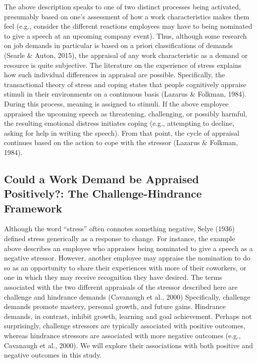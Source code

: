 \documentclass[
  man]{apa6}
\begin{document}
The above description speaks to one of two distinct processes being activated, presumably based on one's assessment of how a work characteristics makes them feel (e.g., consider the different reactions employees may have to being nominated to give a speech at an upcoming company event). Thus, although some research on job demands in particular is based on a priori classifications of demands (Searle \& Auton, 2015), the appraisal of any work characteristic as a demand or resource is quite subjective. The literature on the experience of stress explains how such individual differences in appraisal are possible. Specifically, the transactional theory of stress and coping states that people cognitively appraise stimuli in their environments on a continuous basis (Lazarus \& Folkman, 1984). During this process, meaning is assigned to stimuli. If the above employee appraised the upcoming speech as threatening, challenging, or possibly harmful, the resulting emotional distress initiates coping (e.g., attempting to decline, asking for help in writing the speech). From that point, the cycle of appraisal continues based on the action to cope with the stressor (Lazarus \& Folkman, 1984).

\hypertarget{could-a-work-demand-be-appraised-positively-the-challenge-hindrance-framework}{%
\subsection{Could a Work Demand be Appraised Positively?: The Challenge-Hindrance Framework}\label{could-a-work-demand-be-appraised-positively-the-challenge-hindrance-framework}}

Although the word ``stress'' often connotes something negative, Selye (1936) defined stress generically as a response to change. For instance, the example above describes an employee who appraises being nominated to give a speech as a negative stressor. However, another employee may appraise the nomination to do so as an opportunity to share their experiences with more of their coworkers, or one in which they may receive recognition they have desired. The terms associated with the two different appraisals of the stressor described here are challenge and hindrance demands (Cavanaugh et al., 2000) Specifically, challenge demands promote mastery, personal growth, and future gains. Hindrance demands, in contrast, inhibit growth, learning and goal achievement. Perhaps not surprisingly, challenge stressors are typically associated with positive outcomes, whereas hindrance stressors are associated with more negative outcomes (e.g., Cavanaugh et al., 2000). We will explore their associations with both positive and negative outcomes in this study.
\end{document}
